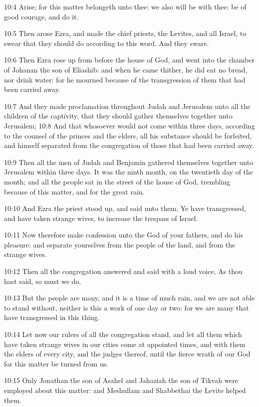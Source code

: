 10:4 Arise; for this matter belongeth unto thee: we also will be with thee: be of good courage, and do it.

10:5 Then arose Ezra, and made the chief priests, the Levites, and all Israel, to swear that they should do according to this word. And they sware.

10:6 Then Ezra rose up from before the house of God, and went into the chamber of Johanan the son of Eliashib: and when he came thither, he did eat no bread, nor drink water: for he mourned because of the transgression of them that had been carried away.

10:7 And they made proclamation throughout Judah and Jerusalem unto all the children of the captivity, that they should gather themselves together unto Jerusalem; 10:8 And that whosoever would not come within three days, according to the counsel of the princes and the elders, all his substance should be forfeited, and himself separated from the congregation of those that had been carried away.

10:9 Then all the men of Judah and Benjamin gathered themselves together unto Jerusalem within three days. It was the ninth month, on the twentieth day of the month; and all the people sat in the street of the house of God, trembling because of this matter, and for the great rain.

10:10 And Ezra the priest stood up, and said unto them, Ye have transgressed, and have taken strange wives, to increase the trespass of Israel.

10:11 Now therefore make confession unto the \LORD God of your fathers, and do his pleasure: and separate yourselves from the people of the land, and from the strange wives.

10:12 Then all the congregation answered and said with a loud voice, As thou hast said, so must we do.

10:13 But the people are many, and it is a time of much rain, and we are not able to stand without, neither is this a work of one day or two: for we are many that have transgressed in this thing.

10:14 Let now our rulers of all the congregation stand, and let all them which have taken strange wives in our cities come at appointed times, and with them the elders of every city, and the judges thereof, until the fierce wrath of our God for this matter be turned from us.

10:15 Only Jonathan the son of Asahel and Jahaziah the son of Tikvah were employed about this matter: and Meshullam and Shabbethai the Levite helped them.

